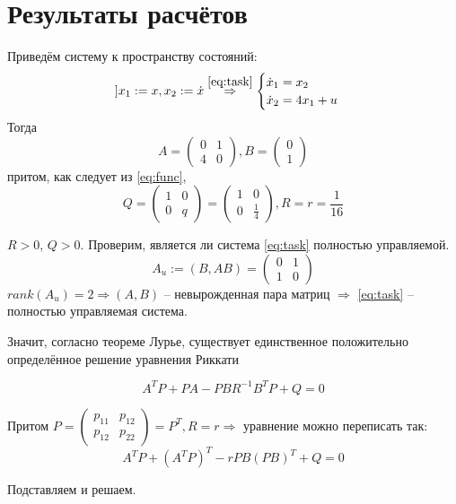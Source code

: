\documentclass[a4paper,12pt]{article}
\begin{document}
\section{ Результаты расчётов }

Приведём систему к пространству состояний:
\[ ] x_1 := x, x_2 := \dot x \overset{\eqref{eq:task}}\Rightarrow \begin{cases}
    \dot x_1 = x_2 \\
    \dot x_2 = 4 x_1 + u
\end{cases} \]
Тогда
\[ A = \begin{pmatrix}
    0 & 1 \\
    4 & 0
\end{pmatrix}, B = \begin{pmatrix}
0 \\ 1
\end{pmatrix} \]
притом, как следует из \eqref{eq:func},
\[ Q = \begin{pmatrix}
    1 & 0 \\
    0 & q
\end{pmatrix} = \begin{pmatrix}
1 & 0 \\
0 & \frac{1}{4}
\end{pmatrix}, R = r = \frac{1}{16} \]

$ R > 0 $, $ Q > 0 $.
Проверим, является ли система \eqref{eq:task} полностью управляемой.
\[ A_u := (B, AB) = \begin{pmatrix}
    0 & 1 \\
    1 & 0
\end{pmatrix} \]
$ rank(A_u) = 2 \Rightarrow (A, B) $ -- невырожденная пара матриц $ \Rightarrow $ \eqref{eq:task} -- полностью управляемая система.

Значит, согласно теореме Лурье, существует единственное положительно определённое решение уравнения Риккати

\[ A^T P + PA - PB R^{-1} B^T P + Q = 0 \]

Притом
$ P = \begin{pmatrix}
    p_{11} & p_{12} \\
    p_{12} & p_{22}
\end{pmatrix} = P^T, R = r \Rightarrow $ уравнение можно переписать так:
\[ A^T P + (A^T P)^T - rPB(PB)^T + Q = 0 \]

Подставляем и решаем.
\end{document}
